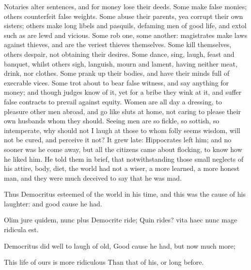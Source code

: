 {Notaries alter sentences, and for money lose their deeds. Some make
false monies; others counterfeit false weights. Some abuse their
parents, yea corrupt their own sisters; others make long libels and
pasquils, defaming men of good life, and extol such as are lewd and
vicious. Some rob one, some another: magistrates make laws against
thieves, and are the veriest thieves themselves. Some kill themselves,
others despair, not obtaining their desires. Some dance, sing, laugh,
feast and banquet, whilst others sigh, languish, mourn and lament,
having neither meat, drink, nor clothes. Some prank up their
bodies, and have their minds full of execrable vices. Some trot about
to bear false witness, and say anything for money; and though
judges know of it, yet for a bribe they wink at it, and suffer false
contracts to prevail against equity. Women are all day a dressing, to
pleasure other men abroad, and go like sluts at home, not caring to
please their own husbands whom they should. Seeing men are so fickle,
so sottish, so intemperate, why should not I laugh at those to whom
folly seems wisdom, will not be cured, and perceive it not?
It grew late: Hippocrates left him; and no sooner was he come away, but
all the citizens came about flocking, to know how he liked him. He told
them in brief, that notwithstanding those small neglects of his attire,
body, diet, the world had not a wiser, a more learned, a more
honest man, and they were much deceived to say that he was mad.

Thus Democritus esteemed of the world in his time, and this was the
cause of his laughter: and good cause he had.

Olim jure quidem, nunc plus Democrite ride;
Quin rides? vita haec nunc mage ridicula est.


Democritus did well to laugh of old,
Good cause he had, but now much more;

This life of ours is more ridiculous
Than that of his, or long before.

}
